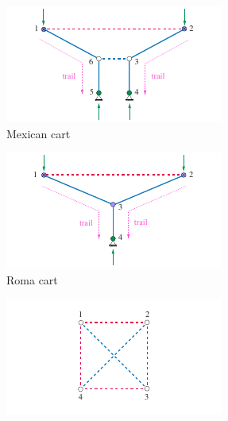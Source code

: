 \begin{figure}[t]
    \hspace{-2.0cm}
        \centering
        \begin{subfigure}[b]{0.37\textwidth}
            \centering
            \includegraphics[width=\textwidth]{figures/tree_2d.pdf}
            \caption{Mexican cart}
            \label{fig:tree_2d}
        \end{subfigure}
        \hspace{-1.0cm}
        \begin{subfigure}[b]{0.37\textwidth}
            \centering
            \includegraphics[width=\textwidth]{figures/tree_2d_wrong.pdf}
            \caption{Roma cart}
            \label{fig:tree_2d_wrong}
        \end{subfigure}
        \hspace{-1.0cm}
        \begin{subfigure}[b]{0.37\textwidth}
            \centering
            \includegraphics[width=\textwidth]{figures/square_tensegrity_wrong.pdf}

\end{subfigure}
\end{figure}
